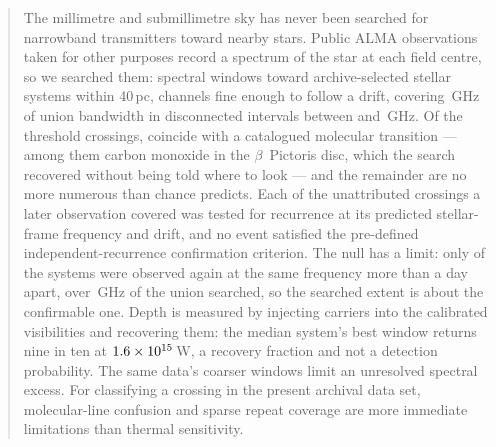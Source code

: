 \begin{abstract}
The millimetre and submillimetre sky has never been searched for narrowband
transmitters toward nearby stars. Public ALMA observations taken for other
purposes record a spectrum of the star at each field centre, so we searched
them: \NWinA{} spectral windows toward \NSysClassA{} archive-selected stellar
systems within 40\,pc, channels fine enough to follow a drift, covering
\CvUnionA\,GHz of union bandwidth in disconnected intervals between
\SurvFreqLoA{} and \SurvFreqHiA\,GHz. Of the \NCross{} threshold crossings,
\NAttributed{} coincide with a catalogued molecular transition --- among them
carbon monoxide in the $\beta$~Pictoris disc, which the search recovered
without being told where to look --- and the remainder are no more numerous
than chance predicts. Each of the \NUnattributed{} unattributed crossings a
later observation covered was tested for recurrence at its predicted stellar-frame frequency and
drift, and no event satisfied the pre-defined independent-recurrence
confirmation criterion. The null has a limit: only \RcConfSysDay{} of the
\NSysClassA{} systems were observed again at the same frequency more than a
day apart, over \CvConfGHzDay\,GHz of the union searched, so the searched
extent is about \PrConfFactor{} the confirmable one. Depth is measured by injecting carriers into the calibrated
visibilities and recovering them: the median system's best window returns nine
in ten at $\EirpNinetySysMedA$\,W, a recovery fraction and not a detection
probability. The same data's coarser windows limit an unresolved spectral
excess. For classifying a crossing in the present archival data set,
molecular-line confusion and sparse repeat coverage are more immediate
limitations than thermal sensitivity.
\end{abstract}



